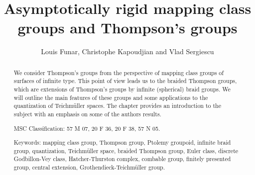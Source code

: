 \documentclass[twoside]{irmaems}
\theoremstyle{plain}
\theoremstyle{definition}
\theoremstyle{remark}
\begin{document}
\title{Asymptotically rigid mapping class groups and Thompson's groups}

\author{Louis Funar, Christophe Kapoudjian and Vlad Sergiescu 
}
\begin{small}\address{
Institut Fourier BP 74, UMR 5582 \\      
University of Grenoble I \\      
38402 Saint-Martin-d'H\`eres cedex, France  \\      
e-mail: \,{\tt \{funar,sergiesc\}@fourier.ujf-grenoble.fr}  \\
[4pt]
Laboratoire Emile Picard, UMR 5580\\      
University of Toulouse   III\\      
31062 Toulouse cedex 4, France\\      
e-mail:\, {\tt ckapoudj@picard.ups-tlse.fr}\\
} 
\end{small}




\maketitle




\begin{abstract}
We consider Thompson's groups from the perspective of 
mapping class groups of surfaces of infinite type. This point of view leads 
us to the braided Thompson groups, which are extensions 
of Thompson's groups by infinite (spherical) braid groups. 
We will outline the main features of these groups and some applications to 
the quantization of Teichm\"uller spaces. 
The chapter provides an introduction to the subject 
with an emphasis on some of the authors results.  


\vspace{0.1cm}
 MSC Classification: 57 M 07, 20 F 36, 20 F 38, 57 N 05.  
 
\noindent Keywords: mapping class group, Thompson group, Ptolemy groupoid, infinite braid group, 
quantization, Teichm\"uller space, braided Thompson group, Euler class, 
discrete Godbillon-Vey class, Hatcher-Thurston complex, combable group, 
finitely presented group, central extension, Grothendieck-Teichm\"uller group. 
\end{abstract}
\end{document}
